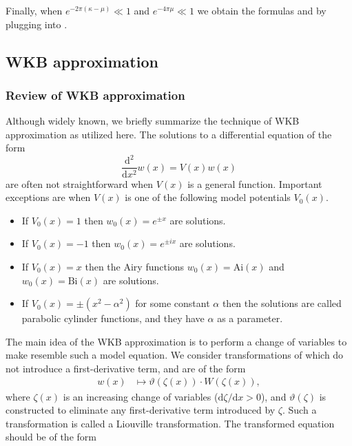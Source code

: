 Finally, when $e^{-2\pi(\kappa-\mu)}\ll1$ and $e^{-4\pi\mu}\ll1$ we obtain the formulas  and  by plugging  into .

\subsection{WKB approximation }

\subsubsection{Review of WKB approximation\label{subsec:WKB-review}}

Although widely known, we briefly summarize the technique of WKB approximation as utilized here. The solutions to a differential equation of the form 
\begin{equation}
\frac{\mathrm{d}^{2}}{\mathrm{d}x^{2}}w(x)=V(x)w(x)\label{eq:WKB-orig}
\end{equation}
 are often not straightforward when $V(x)$ is a general function. Important exceptions are when $V(x)$ is one of the following model potentials $V_{0}(x)$. 
\begin{itemize}
\item If $V_{0}(x)=1$ then $w_{0}(x)=e^{\pm x}$ are solutions. 
\item If $V_{0}(x)=-1$ then $w_{0}(x)=e^{\pm ix}$ are solutions. 
\item If $V_{0}(x)=x$ then the Airy functions $w_{0}(x)=\mathrm{Ai}(x)$ and $w_{0}(x)=\mathrm{Bi}(x)$ are solutions. 
\item If $V_{0}(x)=\pm\left(x^{2}-\alpha^{2}\right)$ for some constant $\alpha$ then the solutions are called parabolic cylinder functions, and they have $\alpha$ as a parameter. 
\end{itemize}
The main idea of the WKB approximation is to perform a change of variables to make  resemble such a model equation. We consider transformations of  which do not introduce a first-derivative term, and are of the form 
\begin{align}
w(x) & \mapsto\vartheta(\zeta(x))\cdot W(\zeta(x)),\label{eq:liouville}
\end{align}
 where $\zeta(x)$ is an increasing change of variables ($\mathrm{d}\zeta/\mathrm{d}x>0$), and $\vartheta(\zeta)$ is constructed to eliminate any first-derivative term introduced by $\zeta$. Such a transformation is called a Liouville transformation. The transformed equation should be of the form 
